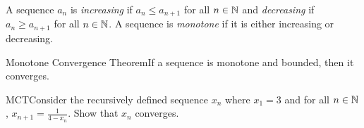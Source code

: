 \begin{definition}
    A sequence \(a_n\) is \textit{increasing} if \(a_n \leq a_{n+1}\) for all \(n \in \mathbb{N}\) and \textit{decreasing} if \(a_n \geq a_{n+1}\) for all \(n \in \mathbb{N}\). A sequence is \textit{monotone} if it is either increasing or decreasing.
\end{definition}

\begin{ntheorem}
    {Monotone Convergence Theorem}If a sequence is monotone and bounded, then it converges.
\end{ntheorem}


\begin{example}
    {MCT}Consider the recursively defined sequence \(x_n\) where \(x_1 = 3\) and for all \(n \in \mathbb{N}\), \(x_{n + 1} = \frac{1}{4 - x_n}\). Show that \(x_n\) converges.
\end{example}

